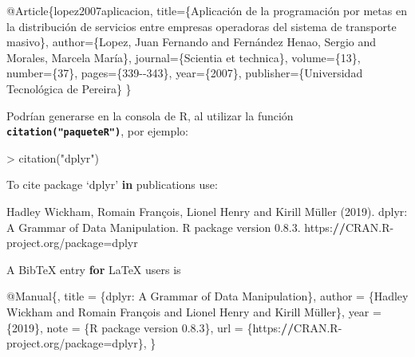 \documentclass[12pt,a4paper,oneside,]{article}
\newenvironment{Shaded}{\begin{snugshade}}{\end{snugshade}}
\newcommand{\ControlFlowTok}[1]{\textcolor[rgb]{0.13,0.29,0.53}{\textbf{#1}}}
\newcommand{\DataTypeTok}[1]{\textcolor[rgb]{0.13,0.29,0.53}{#1}}
\newcommand{\DecValTok}[1]{\textcolor[rgb]{0.00,0.00,0.81}{#1}}
\newcommand{\ErrorTok}[1]{\textcolor[rgb]{0.64,0.00,0.00}{\textbf{#1}}}
\newcommand{\FloatTok}[1]{\textcolor[rgb]{0.00,0.00,0.81}{#1}}
\newcommand{\FunctionTok}[1]{\textcolor[rgb]{0.00,0.00,0.00}{#1}}
\newcommand{\NormalTok}[1]{#1}
\newcommand{\OtherTok}[1]{\textcolor[rgb]{0.56,0.35,0.01}{#1}}
\newcommand{\SpecialCharTok}[1]{\textcolor[rgb]{0.00,0.00,0.00}{#1}}
\newcommand{\StringTok}[1]{\textcolor[rgb]{0.31,0.60,0.02}{#1}}
\newcommand{\VariableTok}[1]{\textcolor[rgb]{0.00,0.00,0.00}{#1}}
\numberwithin{dummy}{section}
\theoremstyle{ocrenumbox}
\theoremstyle{blacknumex}
\theoremstyle{blacknumbox}
\theoremstyle{ocrenum}
\theoremstyle{ocrenum}
\begin{document}
\begin{Shaded}
\begin{Highlighting}[]
\VariableTok{@Article}\NormalTok{\{}\OtherTok{lopez2007aplicacion}\NormalTok{,}
  \DataTypeTok{title}\NormalTok{=\{Aplicación de la programación por metas en la distribución de }
\NormalTok{  servicios entre empresas operadoras del sistema de transporte masivo\},}
  \DataTypeTok{author}\NormalTok{=\{Lopez, Juan Fernando and Fernández Henao, Sergio and Morales,}
\NormalTok{  Marcela María\},}
  \DataTypeTok{journal}\NormalTok{=\{Scientia et technica\},}
  \DataTypeTok{volume}\NormalTok{=\{13\},}
  \DataTypeTok{number}\NormalTok{=\{37\},}
  \DataTypeTok{pages}\NormalTok{=\{339{-}{-}343\},}
  \DataTypeTok{year}\NormalTok{=\{2007\},}
  \DataTypeTok{publisher}\NormalTok{=\{Universidad Tecnológica de Pereira\}}
\NormalTok{\}}

\end{Highlighting}
\end{Shaded}

Podrían generarse en la consola de R, al utilizar la función
\textbf{\texttt{citation("paqueteR")}}, por ejemplo:

\footnotesize

\begin{Shaded}
\begin{Highlighting}[]
\SpecialCharTok{\textgreater{}} \FunctionTok{citation}\NormalTok{(}\StringTok{"dplyr"}\NormalTok{)}

\NormalTok{To cite package ‘dplyr’ }\ControlFlowTok{in}\NormalTok{ publications use}\SpecialCharTok{:}

\NormalTok{  Hadley Wickham, Romain François, Lionel Henry and Kirill Müller (}\DecValTok{2019}\NormalTok{). dplyr}\SpecialCharTok{:}\NormalTok{ A}
\NormalTok{  Grammar of Data Manipulation. R package version }\DecValTok{0}\NormalTok{.}\DecValTok{8}\NormalTok{.}\FloatTok{3.}
\NormalTok{  https}\SpecialCharTok{:}\ErrorTok{//}\NormalTok{CRAN.R}\SpecialCharTok{{-}}\NormalTok{project.org}\SpecialCharTok{/}\NormalTok{package}\OtherTok{=}\NormalTok{dplyr}

\NormalTok{A BibTeX entry }\ControlFlowTok{for}\NormalTok{ LaTeX users is}

  \SpecialCharTok{@}\NormalTok{Manual\{,}
\NormalTok{    title }\OtherTok{=}\NormalTok{ \{dplyr}\SpecialCharTok{:}\NormalTok{ A Grammar of Data Manipulation\},}
\NormalTok{    author }\OtherTok{=}\NormalTok{ \{Hadley Wickham and Romain François and Lionel Henry and Kirill Müller\},}
\NormalTok{    year }\OtherTok{=}\NormalTok{ \{}\DecValTok{2019}\NormalTok{\},}
\NormalTok{    note }\OtherTok{=}\NormalTok{ \{R package version }\DecValTok{0}\NormalTok{.}\FloatTok{8.3}\NormalTok{\},}
\NormalTok{    url }\OtherTok{=}\NormalTok{ \{https}\SpecialCharTok{:}\ErrorTok{//}\NormalTok{CRAN.R}\SpecialCharTok{{-}}\NormalTok{project.org}\SpecialCharTok{/}\NormalTok{package}\OtherTok{=}\NormalTok{dplyr\},}
\NormalTok{  \}}
\end{Highlighting}
\end{Shaded}
\end{document}

